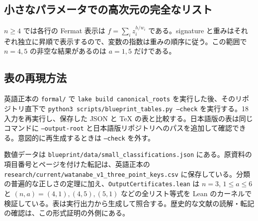 \begin{table}[htbp]
\centering\small

\caption{$n=3$, $a=1$：14同型類。}
\label{tab:ternary1}
\end{table}
\begin{table}[htbp]
\centering\small

\caption{$n=3$, $a=2$：6同型類。}
\label{tab:ternary2}
\end{table}
\begin{table}[htbp]
\centering\small

\caption{$n=3$, $a=3$：8同型類。}
\label{tab:ternary3}
\end{table}
\begin{table}[htbp]
\centering\small

\caption{$n=3$, $a=4$：8同型類。}
\label{tab:ternary4}
\end{table}
\begin{table}[htbp]
\centering\small

\caption{$n=3$, $a=5$：21同型類。}
\label{tab:ternary5}
\end{table}

\clearpage
\subsection{小さなパラメータでの高次元の完全なリスト}
$n\geq4$ では各行の Fermat 表示は $f=\sum_i z_i^{h/w_i}$ である。signature と重みはそれぞれ独立に昇順で表示するので、変数の指数は重みの順序に従う。この範囲で $n=4,5$ の非空な結果があるのは $a=1,5$ だけである。

\begin{table}[htbp]
\centering\small

\caption{$n=4$（次元3）、$1\leq a\leq6$ の全同型類。}
\label{tab:higher4}
\end{table}
\begin{table}[htbp]
\centering\small

\caption{$n=5$（次元4）、$1\leq a\leq6$ の全同型類。}
\label{tab:higher5}
\end{table}

\subsection{表の再現方法}
英語正本の \texttt{formal/} で \texttt{lake build canonical\_roots} を実行した後、そのリポジトリ直下で \texttt{python3 scripts/blueprint\_tables.py --check} を実行する。18入力を再実行し、保存した JSON と TeX の表と比較する。日本語版の表は同じコマンドに \texttt{--output-root} と日本語版リポジトリへのパスを追加して確認できる。意図的に再生成するときは \texttt{--check} を外す。

数値データは \texttt{blueprint/data/small\_classifications.json} にある。原資料の項目番号とページを付けた転記は、英語正本の \texttt{research/current/watanabe\_v1\_three\_point\_keys.csv} に保存している。分類の普遍的な正しさの定理に加え、\texttt{OutputCertificates.lean} は $n=3$, $1\leq a\leq6$ と $(n,a)=(4,1),(4,5),(5,1)$ などの全リスト等式を Lean のカーネルで検証している。表は実行出力から生成して照合する。歴史的な文献の読解・転記の確認は、この形式証明の外側にある。
